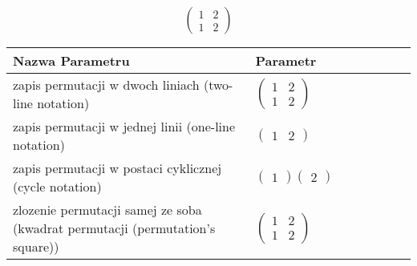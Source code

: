 \documentclass[12pt]{article}
\begin{document}
\subsection{}
\begin{center}
\[
\begin{pmatrix}
	1 & 2 \\ 
	1 & 2 
\end{pmatrix}
\]

\begin{tabular}{|m{0.6\linewidth}|m{0.4\linewidth}|}
	\hline
	Nazwa Parametru & Parametr \\
	\hline
	zapis permutacji w dwoch liniach (two-line notation) & $\begin{pmatrix} 1 & 2 \\ 
1 & 2 \end{pmatrix}$ \\ 
	\hline
	zapis permutacji w jednej linii (one-line notation) & $\begin{pmatrix} 1 & 2 \end{pmatrix}$ \\ 
	\hline
	zapis permutacji w postaci cyklicznej (cycle notation) & $\begin{pmatrix} 1 \end{pmatrix} \begin{pmatrix} 2 \end{pmatrix} $ \\ 
	\hline
	zlozenie permutacji samej ze soba (kwadrat permutacji (permutation's square)) & $\begin{pmatrix} 1 & 2 \\ 
1 & 2 \end{pmatrix}$ \\ 
	\hline
\end{tabular}
\end{center}
\end{document}
